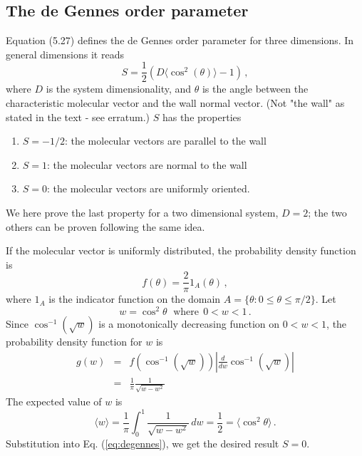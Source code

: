 \documentclass[11pt]{article}
\begin{document}
\subsection*{The de Gennes order parameter}
Equation (5.27) defines the de Gennes order parameter for three dimensions. In general dimensions it reads
\begin{equation}
	\label{eq:degennes}
	S = \frac{1}{2}(D \langle \cos^2(\theta)\rangle -1) \, ,
\end{equation}
where $D$ is the system dimensionality, and 
$\theta$ is the angle between the characteristic molecular vector and the wall normal vector. 
(Not "the wall" as stated in the text - see erratum.) $S$ has the properties
\begin{enumerate}
\item $S=-1/2$: the molecular vectors are parallel to the wall
\item $S= 1$: the molecular vectors are normal to the wall
\item $S=0$: the molecular vectors are uniformly oriented. 
\end{enumerate}
\noindent We here prove the last property for a two dimensional system, $D=2$; the two others can be proven following the same idea. 

If the molecular vector is uniformly distributed, the probability density function is 
\begin{equation}
	f(\theta) = \frac{2}{\pi} 1_A(\theta) \,  ,
\end{equation}
where $1_A$ is the indicator function on the domain $A= \{\theta : 0\leq \theta \leq \pi/2\}$. Let 
\begin{equation} 
	w = \cos^2 \theta \, \ \ \text{where} \ \ 0 < w < 1 \, .
\end{equation}
Since $\cos^{-1}(\sqrt{w})$ is a monotonically decreasing function on  $0 < w < 1$, 
the probability density function for $w$ is 
\begin{eqnarray}
 	g(w) &=& f ( \cos^{-1}(\sqrt{w}) ) \left| \frac{d}{dw} \cos^{-1}(\sqrt{w}) \right| \nonumber \\
 		&=& \frac{1}{\pi} \frac{1}{\sqrt{w - w^2}} 
\end{eqnarray}
The expected value of $w$ is
\begin{equation}
\langle w \rangle = \frac{1}{\pi}\int_0^1 \frac{1}{\sqrt{w - w^2}} \, dw = \frac{1}{2} = \langle \cos^2 \theta \rangle \, .
\end{equation}
Substitution into Eq. (\ref{eq:degennes}), we get the desired result $S=0$.
\end{document}
